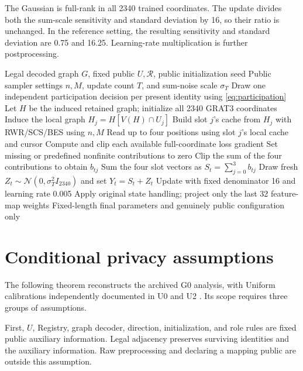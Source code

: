 The Gaussian is full-rank in all 2340 trained coordinates. The update divides both the sum-scale sensitivity and standard deviation by 16, so their ratio is unchanged. In the reference setting, the resulting sensitivity and standard deviation are 0.75 and 16.25. Learning-rate multiplication is further postprocessing.

\begin{algorithm}[H]
\caption{PDP-PrivIM training (ideal mathematical description)}\label{alg:pdp}
\begin{algorithmic}[1]
\Require Legal decoded graph $G$, fixed public $U,\mathcal R$, public initialization seed
\Require Public sampler settings $n,M$, update count $T$, and sum-noise scale $\sigma_T$
\State Draw one independent participation decision per present identity using \eqref{eq:participation}
\State Let $H$ be the induced retained graph; initialize all 2340 GRAT3 coordinates
  \State Induce the local graph $H_j = H[V(H)\cap U_j]$
  \State Build slot $j$'s cache from $H_j$ with RWR/SCS/BES using $n,M$
\EndFor
{}
  \State Read up to four positions using slot $j$'s local cache and cursor
  \State Compute and clip each available full-coordinate loss gradient
  \State Set missing or predefined nonfinite contributions to zero
  \State Clip the sum of the four contributions to obtain $b_{tj}$
 \EndFor
 \State Sum the four slot vectors as $S_t=\sum_{j=0}^{3} b_{tj}$
 \State Draw fresh $Z_t\sim\mathcal N(0,\sigma_T^2I_{2340})$ and set $Y_t=S_t+Z_t$
 \State Update with fixed denominator 16 and learning rate 0.005
 \State Apply original state handling; project only the last 32 feature-map weights
\EndFor
\State \Return Fixed-length final parameters and genuinely public configuration only
\end{algorithmic}
\end{algorithm}

\section{Conditional privacy assumptions}\label{sec:conditions}
The following theorem reconstructs the archived G0 analysis, with Uniform calibrations independently documented in U0 and U2 \cite{projectg0,projectuniform}. Its scope requires three groups of assumptions.

First, $U$, Registry, graph decoder, direction, initialization, and role rules are fixed public auxiliary information. Legal adjacency preserves surviving identities and the auxiliary information. Raw preprocessing and declaring a mapping public are outside this assumption.

